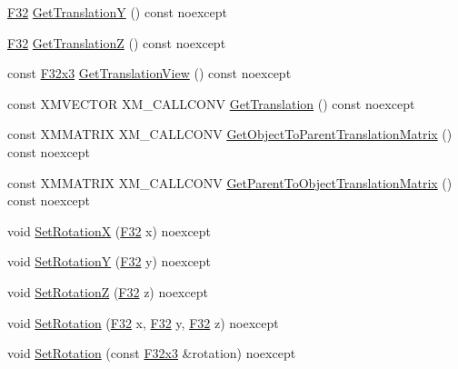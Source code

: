 \begin{DoxyCompactItemize}
\item 
\mbox{\hyperlink{namespacemage_aa97e833b45f06d60a0a9c4fc22ae02c0}{F32}} \mbox{\hyperlink{classmage_1_1_transform_a3a806edeeca4db92bdfa4d401ba17cb4}{Get\+TranslationY}} () const noexcept
\item 
\mbox{\hyperlink{namespacemage_aa97e833b45f06d60a0a9c4fc22ae02c0}{F32}} \mbox{\hyperlink{classmage_1_1_transform_a2899159e8e953026bf8b6863c65f454f}{Get\+TranslationZ}} () const noexcept
\item 
const \mbox{\hyperlink{namespacemage_a1e3c7a882af461f161caa1cbddaf1fa2}{F32x3}} \mbox{\hyperlink{classmage_1_1_transform_a78be45f1e45a86c86f5d1c3a6299b04a}{Get\+Translation\+View}} () const noexcept
\item 
const X\+M\+V\+E\+C\+T\+OR X\+M\+\_\+\+C\+A\+L\+L\+C\+O\+NV \mbox{\hyperlink{classmage_1_1_transform_a9248e3decb8b202cded00722f17cf642}{Get\+Translation}} () const noexcept
\item 
const X\+M\+M\+A\+T\+R\+IX X\+M\+\_\+\+C\+A\+L\+L\+C\+O\+NV \mbox{\hyperlink{classmage_1_1_transform_adfecbcf77681da90a0d22690621936b3}{Get\+Object\+To\+Parent\+Translation\+Matrix}} () const noexcept
\item 
const X\+M\+M\+A\+T\+R\+IX X\+M\+\_\+\+C\+A\+L\+L\+C\+O\+NV \mbox{\hyperlink{classmage_1_1_transform_af59262c0537f9ecb6ab9af0b6dbc70d2}{Get\+Parent\+To\+Object\+Translation\+Matrix}} () const noexcept
\item 
void \mbox{\hyperlink{classmage_1_1_transform_ac626eec777b86b0a1fc946703c962eda}{Set\+RotationX}} (\mbox{\hyperlink{namespacemage_aa97e833b45f06d60a0a9c4fc22ae02c0}{F32}} x) noexcept
\item 
void \mbox{\hyperlink{classmage_1_1_transform_aaf2754a227e2cf416960a92f7e4c5dc7}{Set\+RotationY}} (\mbox{\hyperlink{namespacemage_aa97e833b45f06d60a0a9c4fc22ae02c0}{F32}} y) noexcept
\item 
void \mbox{\hyperlink{classmage_1_1_transform_aca5e1d7c83e91f9c36be98c4a4a2163b}{Set\+RotationZ}} (\mbox{\hyperlink{namespacemage_aa97e833b45f06d60a0a9c4fc22ae02c0}{F32}} z) noexcept
\item 
void \mbox{\hyperlink{classmage_1_1_transform_ad4c49c5298d68f3945698ba88e461145}{Set\+Rotation}} (\mbox{\hyperlink{namespacemage_aa97e833b45f06d60a0a9c4fc22ae02c0}{F32}} x, \mbox{\hyperlink{namespacemage_aa97e833b45f06d60a0a9c4fc22ae02c0}{F32}} y, \mbox{\hyperlink{namespacemage_aa97e833b45f06d60a0a9c4fc22ae02c0}{F32}} z) noexcept
\item 
void \mbox{\hyperlink{classmage_1_1_transform_a6a49db001ee9529bfedb1e278ce67689}{Set\+Rotation}} (const \mbox{\hyperlink{namespacemage_a1e3c7a882af461f161caa1cbddaf1fa2}{F32x3}} \&rotation) noexcept

\end{DoxyCompactItemize}
